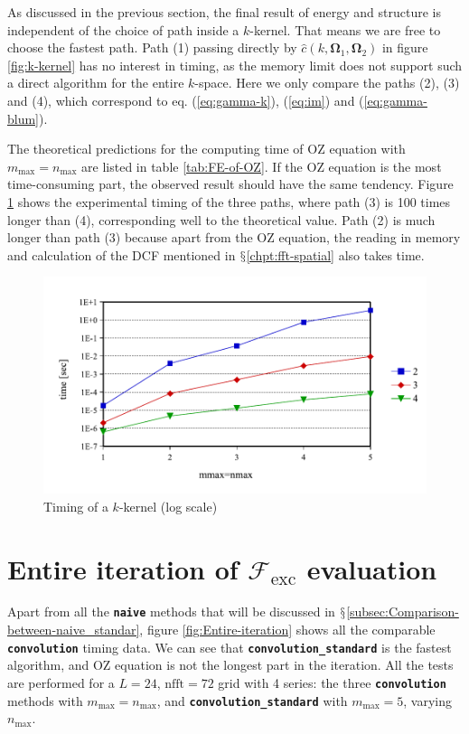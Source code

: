As discussed in the previous section, the final result of energy and
structure is independent of the choice of path inside a $k$-kernel.
That means we are free to choose the fastest path. Path (1) passing
directly by $\hat{c}(k,\mathbf{\Omega}_{1},\mathbf{\Omega}_{2})$
in figure \ref{fig:k-kernel} has no interest in timing, as the memory
limit does not support such a direct algorithm for the entire $k$-space.
Here we only compare the paths (2), (3) and (4), which correspond
to eq. (\ref{eq:gamma-k}), (\ref{eq:im}) and (\ref{eq:gamma-blum}).

The theoretical predictions for the computing time of \acs{OZ} equation
with $m_{\max}=n_{\max}$ are listed in table \ref{tab:FE-of-OZ}.
If the \acs{OZ} equation is the most time-consuming part, the observed
result should have the same tendency. Figure \ref{fig:Timing-k-kernel}
shows the experimental timing of the three paths, where path (3) is
100 times longer than (4), corresponding well to the theoretical value.
Path (2) is much longer than path (3) because apart from the \acs{OZ}
equation, the reading in memory and calculation of the \acs{DCF}
mentioned in $\mathsection$\ref{chpt:fft-spatial} also takes time.

\begin{figure}[H]
\begin{centering}
\includegraphics[bb=0bp 20bp 453bp 236bp,width=0.65\columnwidth]{_figure/results/k-kernel}
\par\end{centering}
\caption[Timing of a $k$-kernel]{Timing of a $k$-kernel (log scale)\label{fig:Timing-k-kernel}}
\end{figure}


\section{Entire iteration of $\mathcal{F}_{\mathrm{exc}}$ evaluation}

Apart from all the \texttt{\textbf{naive}} methods that will be discussed
in $\mathsection$\ref{subsec:Comparison-between-naive_standar},
figure \ref{fig:Entire-iteration} shows all the comparable \texttt{\textbf{convolution}}
timing data. We can see that \texttt{\textbf{convolution\_standard}}
is the fastest algorithm, and \acs{OZ} equation is not the longest
part in the iteration. All the tests are performed for a $L=24$,
$\mathrm{nfft}=72$ grid with 4 series: the three \texttt{\textbf{convolution}}
methods with $m_{\max}=n_{\max}$, and \texttt{\textbf{convolution\_standard}}
with $m_{\max}=5$, varying $n_{\max}$.

